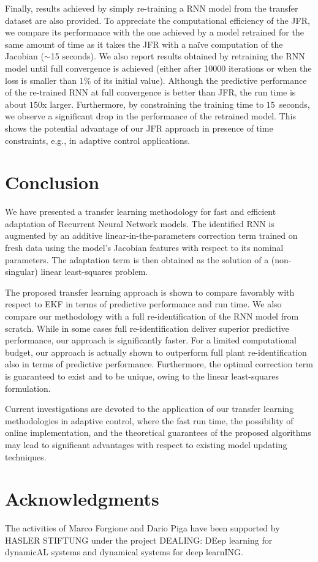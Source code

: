 \documentclass{article}
\begin{document}
Finally,  results achieved by  simply re-training a RNN model from the transfer dataset are also provided.  To appreciate the computational efficiency of the JFR, we compare its performance with  the one achieved by a model retrained for the same amount of time as it takes the JFR with a  na{\"i}ve  computation of the Jacobian  ($\sim$15 seconds). We also report results obtained by retraining the RNN model until full convergence is achieved (either after 10000 iterations or when the loss is smaller than $1$\% of its initial value). Although the predictive performance of the re-trained RNN at full convergence is better than JFR, the run time is about $150$x larger. Furthermore, by constraining the training time to $15$~seconds, we observe a significant drop in the performance of the retrained model. This shows the potential advantage of our JFR approach in presence of time constraints, e.g., in adaptive control applications.  


\section{Conclusion}
\label{sec:conclusion}
We have presented a transfer learning methodology for fast and efficient adaptation of Recurrent Neural Network 
models. The identified RNN is augmented by an additive linear-in-the-parameters correction term trained on fresh data using the model's Jacobian features with respect to its nominal parameters. 
The adaptation term is then obtained as the solution of a (non-singular) linear least-squares problem.

The proposed transfer learning approach is shown to compare favorably with respect to EKF in terms of predictive performance and run time. We also compare our methodology with a full   re-identification of the RNN model from scratch. While in some cases full re-identification deliver superior predictive performance, our approach is significantly faster. For a limited computational budget, our approach is actually shown to outperform full plant re-identification also in terms of predictive performance. 
Furthermore, the optimal correction term is guaranteed to exist and to be unique, owing to the linear least-squares formulation.

Current investigations are devoted to the application of our transfer learning methodologies in adaptive control, where the fast run time, the possibility of online implementation, and the theoretical guarantees of the  proposed algorithms may lead to significant advantages with respect to existing model updating techniques.


\section*{Acknowledgments}
The activities of Marco Forgione and Dario Piga have  been supported by HASLER STIFTUNG under the project DEALING: DEep learning for dynamicAL systems and dynamical systems for deep learnING.

  
  
\end{document}
